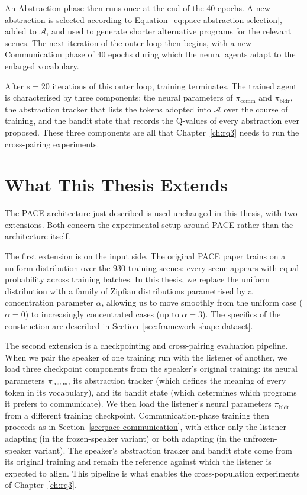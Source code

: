 An Abstraction phase then runs once at the end of the 40 epochs. A new abstraction is selected according to Equation~\ref{eq:pace-abstraction-selection}, added to $\mathcal{A}$, and used to generate shorter alternative programs for the relevant scenes. The next iteration of the outer loop then begins, with a new Communication phase of 40 epochs during which the neural agents adapt to the enlarged vocabulary.

After $s = 20$ iterations of this outer loop, training terminates. The trained agent is characterised by three components: the neural parameters of $\pi_{\text{comm}}$ and $\pi_{\text{bldr}}$, the abstraction tracker that lists the tokens adopted into $\mathcal{A}$ over the course of training, and the bandit state that records the Q-values of every abstraction ever proposed. These three components are all that Chapter~\ref{ch:rq3} needs to run the cross-pairing experiments.

\section{What This Thesis Extends}
\label{sec:pace-extensions}

The PACE architecture just described is used unchanged in this thesis, with two extensions. Both concern the experimental setup around PACE rather than the architecture itself.

The first extension is on the input side. The original PACE paper trains on a uniform distribution over the 930 training scenes: every scene appears with equal probability across training batches. In this thesis, we replace the uniform distribution with a family of Zipfian distributions parametrised by a concentration parameter $\alpha$, allowing us to move smoothly from the uniform case ($\alpha = 0$) to increasingly concentrated cases (up to $\alpha = 3$). The specifics of the construction are described in Section~\ref{sec:framework-shape-dataset}.

The second extension is a checkpointing and cross-pairing evaluation pipeline. When we pair the speaker of one training run with the listener of another, we load three checkpoint components from the speaker's original training: its neural parameters $\pi_{\text{comm}}$, its abstraction tracker (which defines the meaning of every token in its vocabulary), and its bandit state (which determines which programs it prefers to communicate). We then load the listener's neural parameters $\pi_{\text{bldr}}$ from a different training checkpoint. Communication-phase training then proceeds as in Section~\ref{sec:pace-communication}, with either only the listener adapting (in the frozen-speaker variant) or both adapting (in the unfrozen-speaker variant). The speaker's abstraction tracker and bandit state come from its original training and remain the reference against which the listener is expected to align. This pipeline is what enables the cross-population experiments of Chapter~\ref{ch:rq3}.

